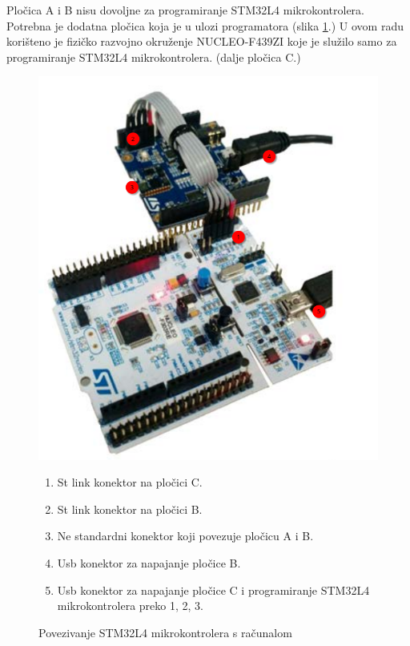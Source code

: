 \documentclass[times, utf8, diplomski]{diplomski}
\begin{document}
Pločica A i B nisu dovoljne za programiranje STM32L4 mikrokontrolera. Potrebna je dodatna pločica koja je u ulozi programatora (slika \ref{fig:prog}.) U ovom radu korišteno je fizičko razvojno okruženje NUCLEO-F439ZI koje je služilo samo za programiranje STM32L4 mikrokontrolera.
(dalje pločica C.)

\begin{figure}[H]
  \includegraphics[scale=0.5]{connection_img.png}
  \centering
  \caption{Povezivanje STM32L4 mikrokontrolera s računalom \cite{gettingstartedsensor}}
  \label{fig:prog}
  \begin{enumerate}
    \item St link konektor na pločici C.
    \item St link konektor na pločici B.
    \item Ne standardni konektor koji povezuje pločicu A i B.
    \item Usb konektor za napajanje pločice B.
    \item Usb konektor za napajanje pločice C i programiranje STM32L4 mikrokontrolera preko 1, 2, 3.
  \end{enumerate}
\end{figure}
\end{document}
